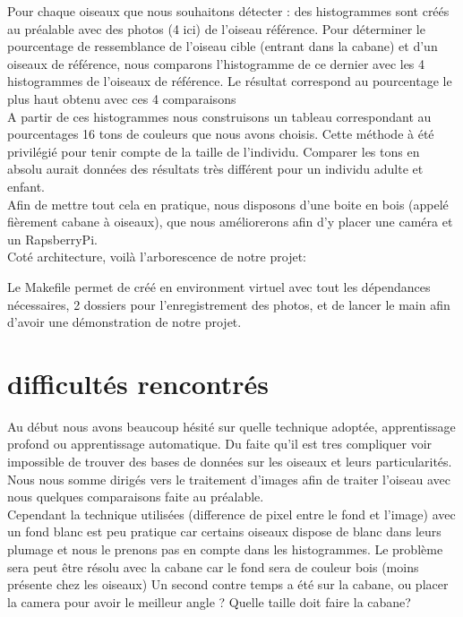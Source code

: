 \documentclass{article}
\begin{document}
Pour chaque oiseaux que nous souhaitons détecter : des histogrammes sont créés au préalable avec des photos (4 ici) de l'oiseau référence.
Pour déterminer le pourcentage de ressemblance de l'oiseau cible (entrant dans la cabane) et d'un oiseaux de référence, nous comparons l'histogramme de ce dernier avec les 4 histogrammes de l'oiseaux de référence. Le résultat correspond au pourcentage le plus haut obtenu avec ces 4 comparaisons\\

A partir de ces histogrammes nous construisons un tableau correspondant au pourcentages 16 tons de couleurs que nous avons choisis.
Cette méthode à été privilégié pour tenir compte de la taille de l'individu.
Comparer les tons en absolu aurait données des résultats très différent pour un individu adulte et enfant. \\

Afin de mettre tout cela en pratique, nous disposons d'une boite en bois  (appelé fièrement cabane à oiseaux), que nous améliorerons afin d'y placer une caméra et un RapsberryPi.\\

Coté architecture, voilà l'arborescence de notre projet:


Le Makefile permet de créé en environment virtuel avec tout les dépendances nécessaires, 2 dossiers pour l'enregistrement des photos, et de lancer le main afin d'avoir une démonstration de notre projet.\\

\section{difficultés rencontrés}
Au début nous avons beaucoup hésité sur quelle technique adoptée, apprentissage profond ou apprentissage automatique. Du faite qu'il est tres compliquer voir  impossible de trouver des bases de données sur les oiseaux et leurs particularités. Nous nous somme dirigés vers le traitement d'images afin de traiter l'oiseau avec nous quelques comparaisons faite au préalable. \\ 
Cependant la technique utilisées (difference de pixel entre le fond et l'image) avec un fond blanc est peu pratique car certains oiseaux dispose de blanc dans leurs plumage et nous le prenons pas en compte dans les histogrammes. Le problème sera peut être résolu avec la cabane car le fond sera de couleur bois (moins présente chez les oiseaux)
Un second contre temps a été sur la cabane, ou placer la camera pour avoir le meilleur angle ? Quelle taille doit faire la cabane? 
\end{document}
